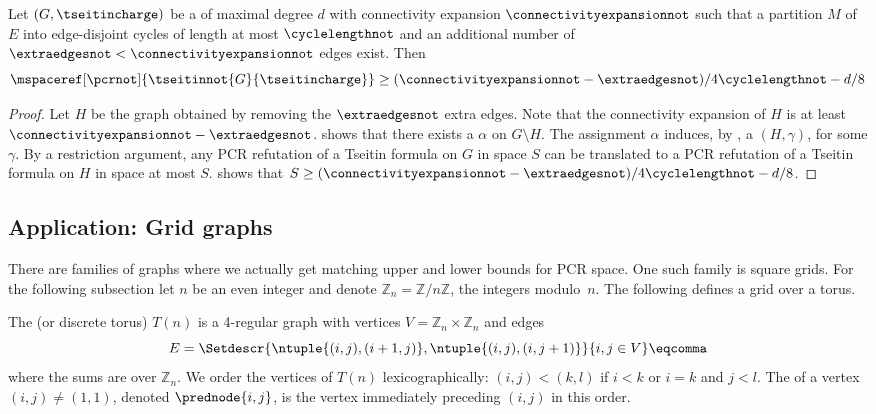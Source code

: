 \documentclass{toc}
\begin{document}
\begin{corollary} \label{cor:tseitin-small-cycles-space-lower-bound}
  Let $(G,\tseitincharge)$ be a \Gnonsplitting \chargedgraph of maximal degree $d$ with connectivity expansion $\connectivityexpansionnot$ such that a partition $M$ of $E$ into edge-disjoint cycles of length at most $\cyclelengthnot$ and an additional number of $\extraedgesnot < \connectivityexpansionnot$ edges exist. Then
  \begin{equation*}
    \mspaceref[\pcrnot]{\tseitinnot{G}{\tseitincharge}}\geq (\connectivityexpansionnot-\extraedgesnot)/4\cyclelengthnot -d/8
  \end{equation*}
\end{corollary}
\begin{proof}
  Let $H$ be the graph obtained by removing the $\extraedgesnot$ extra
  edges. Note that the connectivity expansion of $H$ is at least
  $\connectivityexpansionnot-\extraedgesnot$.
  shows that there exists
  a \nonsplittingassignment $\alpha$ on $G \setminus H$.
  The assignment $\alpha$ induces, by
 , a \Gnonsplitting
  \chargedgraph $(H,\gamma)$, for some $\gamma$.
  By a restriction argument, any PCR refutation of a \Gnonsplitting
  Tseitin formula on $G$ in space $S$ can be translated to a PCR
  refutation of a \Gnonsplitting Tseitin formula on $H$ in space at
  most $S$.  shows
  that
  $S \geq (\connectivityexpansionnot-\extraedgesnot)/4\cyclelengthnot
  -d/8$.
\end{proof}

\subsection{Application: Grid graphs} \label{sec:grids}

There are families of graphs where we actually get matching upper and lower bounds for PCR space. One such family is square grids. For the following subsection let $n$ be an even integer and denote $\mathbb{Z}_n=\mathbb{Z}/n\mathbb{Z}$, the integers modulo~$n$. The following defines a grid over a torus.

\begin{definition}
  \label{def:grid-graph}
  The  (or discrete torus) $T(n)$ is a 4-regular graph with vertices $V=\mathbb{Z}_n\times\mathbb{Z}_n$ and edges
  \begin{equation*}
    E=\Setdescr{\ntuple{(i,j),(i+1,j)},\ntuple{(i,j),(i,j+1)}}{i,j\in V}\eqcomma
  \end{equation*}
  where the sums are over $\mathbb{Z}_n$.
  We order the vertices of $T(n)$ lexicographically: $(i,j) < (k,l)$ if $i<k$ or $i=k$ and $j<l$. The  of a vertex $(i,j) \neq (1,1)$, denoted $\prednode{i,j}$, is the vertex immediately preceding $(i,j)$ in this order.
\end{definition}
\end{document}
